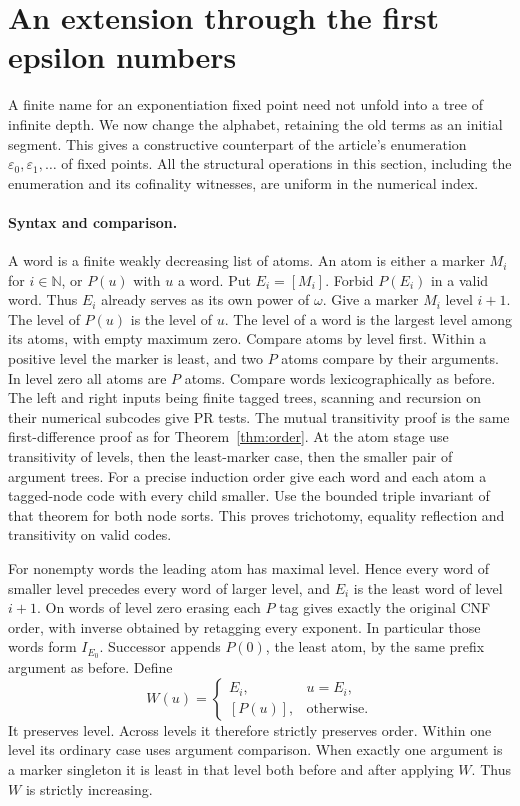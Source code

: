 \section{An extension through the first epsilon numbers}
\label{sec:epsilon}
A finite name for an exponentiation fixed point need not unfold into a tree of infinite depth. We now change the alphabet, retaining the old terms as an initial segment. This gives a constructive counterpart of the article's enumeration $\varepsilon_0,\varepsilon_1,\ldots$ of fixed points. All the structural operations in this section, including the enumeration and its cofinality witnesses, are uniform in the numerical index.

\paragraph{Syntax and comparison.}
A word is a finite weakly decreasing list of atoms. An atom is either a marker $M_i$ for $i\in\mathbb N$, or $P(u)$ with $u$ a word. Put $E_i=[M_i]$. Forbid $P(E_i)$ in a valid word. Thus $E_i$ already serves as its own power of $\omega$. Give a marker $M_i$ level $i+1$. The level of $P(u)$ is the level of $u$. The level of a word is the largest level among its atoms, with empty maximum zero. Compare atoms by level first. Within a positive level the marker is least, and two $P$ atoms compare by their arguments. In level zero all atoms are $P$ atoms. Compare words lexicographically as before. The left and right inputs being finite tagged trees, scanning and recursion on their numerical subcodes give PR tests. The mutual transitivity proof is the same first-difference proof as for Theorem~\ref{thm:order}. At the atom stage use transitivity of levels, then the least-marker case, then the smaller pair of argument trees. For a precise induction order give each word and each atom a tagged-node code with every child smaller. Use the bounded triple invariant of that theorem for both node sorts. This proves trichotomy, equality reflection and transitivity on valid codes.

For nonempty words the leading atom has maximal level. Hence every word of smaller level precedes every word of larger level, and $E_i$ is the least word of level $i+1$. On words of level zero erasing each $P$ tag gives exactly the original CNF order, with inverse obtained by retagging every exponent. In particular those words form $I_{E_0}$. Successor appends $P(0)$, the least atom, by the same prefix argument as before. Define
\[
 W(u)=\begin{cases}E_i,&u=E_i,\\ [P(u)],&\text{otherwise}.\end{cases}
\]
It preserves level. Across levels it therefore strictly preserves order. Within one level its ordinary case uses argument comparison. When exactly one argument is a marker singleton it is least in that level both before and after applying $W$. Thus $W$ is strictly increasing.

